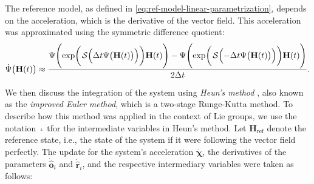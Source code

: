 The reference model, as defined in \eqref{eq:ref-model-linear-parametrization}, depends on the acceleration, which is the derivative of the vector field. This acceleration was approximated using the symmetric difference quotient: 
\begin{align}
    \dot{\Psi}\bigl(\mathbf{H}(t)\bigr) \approx \frac{\Psi\Biggl(\exp\biggl(\SL\Bigl(\Delta t\Psi\bigl(\mathbf{H}(t)\bigr)\Bigr)\biggr)\mathbf{H}(t)\Biggr) - \Psi\Biggl(\exp\biggl(\SL\Bigl(-\Delta t\Psi\bigl(\mathbf{H}(t)\bigr)\Bigr)\biggr)\mathbf{H}(t)\Biggr)}{2\Delta t}. \label{eq:approximation-derivative-psi}
\end{align}

We then discuss the integration of the system using \emph{Heun's method} \citep[p. 330]{fred2007algoritmos}, also known as the \emph{improved Euler method}, which is a two-stage Runge-Kutta method. To describe how this method was applied in the context of Lie groups, we use the notation $\underline{\cdot}$ tfor the intermediate variables in Heun's method. Let $\mathbf{H}_\text{ref}$ denote the reference state, i.e., the state of the system if it were following the vector field perfectly. The update for the system's acceleration $\ddot{\boldsymbol{\chi}}$, the derivatives of the parameters $\dot{\widehat{\mathbf{o}}}_i$ and $\dot{\widehat{\mathbf{r}}}_i$, and the respective intermediary variables were taken as follows:
